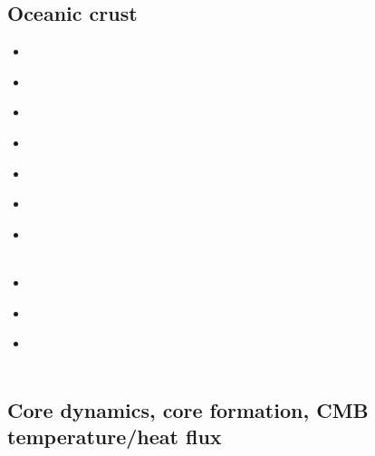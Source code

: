 \subsection{Oceanic crust} 

\begin{scriptsize}
\begin{itemize}
\item[\nineteeneightyeight] 
\textcite{mofo88} \\
\item[\nineteenninetyfour] 
\textcite{chho94} \\
\item[\nineteenninetysix] 
\textcite{vaky96} \\
\item[\twothousandfour] 
\textcite{vavv04b} \\
\item[\twothousandseven] 
\textcite{brva07b} \\
\item[\twothousandeight] 
\textcite{gomm08} \\
\item[\twothousandthirteen] 
\textcite{limc13} \\
\textcite{yosh13} \\
\item[\twothousandfifteen] 
\textcite{rula15} \\
\item[\twothousandseventeen] 
\textcite{taac17} \\
\item[\twothousandtwenty] 
\textcite{mugu20} \\
\textcite{yabt20} \\
\end{itemize}
\end{scriptsize}


\subsection{Core dynamics, core formation, CMB temperature/heat flux}

